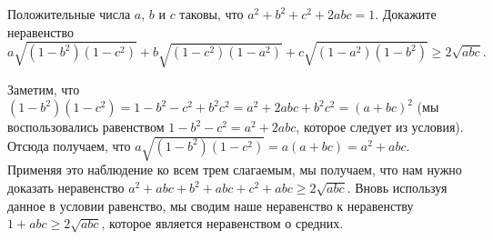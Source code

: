 \problem
Положительные числа $a$, $b$ и $c$ таковы, что $a^2+b^2+c^2+2abc=1$.
Докажите неравенство
\[
    a \sqrt{(1 - b^2) (1 - c^2)}
    +
    b \sqrt{(1 - c^2) (1 - a^2)}
    +
    c \sqrt{(1 - a^2) (1 - b^2)}
\geq
    2 \sqrt{abc}
.\]

\solution
Заметим, что
\(
    (1 - b^2) (1 - c^2)
=
    1 - b^2 - c^2 + b^2 c^2
=
    a^2 + 2 a b c + b^2 c^2
=
    (a + b c)^2
\)
(мы воспользовались равенством $1 - b^2 - c^2 = a^2 + 2 a b c$, которое следует
из условия).
Отсюда получаем, что
\(a \sqrt{(1 - b^2) (1 - c^2)} = a (a + b c) = a^2 + a b c\).
Применяя это наблюдение ко всем трем слагаемым, мы получаем, что нам нужно
доказать неравенство
$a^2 + a b c + b^2 + a b c + c^2 + a b c \geq 2 \sqrt{a b c}$.
Вновь используя данное в условии равенство, мы сводим наше неравенство к
неравенству $1 + a b c \geq 2 \sqrt{a b c}$, которое является неравенством о
средних.
\endproblem
